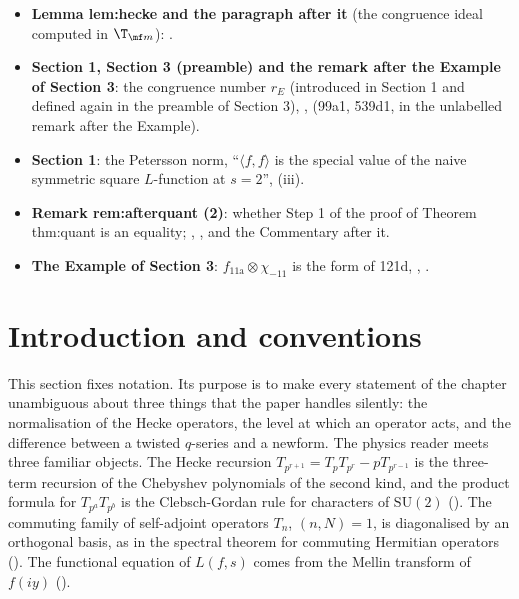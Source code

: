 \begin{itemize}
complement of $g^S$, idempotents of $\T_\ell$, the $\Z_\ell$-version of Lemma lem:crit for $\pi$, , , ,
, , . The theorem is proved in .
\item \textbf{Lemma lem:hecke and the paragraph after it} (the congruence ideal computed in $\T_{\mf m}$): .
\item \textbf{Section 1, Section 3 (preamble) and the remark after the Example of Section 3}: the congruence number $r_E$ (introduced in Section 1 and defined again in the
preamble of Section 3), ,  (99a1, 539d1, in the unlabelled remark after the Example).
\item \textbf{Section 1}: the Petersson norm, ``$\langle f,f\rangle$ is the special value of the naive symmetric square $L$-function at $s=2$'', (iii).
\item \textbf{Remark rem:afterquant (2)}: whether Step 1 of the proof of Theorem thm:quant is an equality; , ,
 and the Commentary after it.
\item \textbf{The Example of Section 3}: $f_{\text{11a}}\otimes\chi_{-11}$ is the form of 121d, , .
\end{itemize}

\section{Introduction and conventions}\label{sec:hecke:intro}

This section fixes notation. Its purpose is to make every statement of the chapter unambiguous about three things that the paper handles silently: the
normalisation of the Hecke operators, the level at which an operator acts, and the difference between a twisted $q$-series and a newform. The physics reader
meets three familiar objects. The Hecke recursion $T_{p^{r+1}}=T_pT_{p^r}-pT_{p^{r-1}}$ is the three-term recursion of the Chebyshev polynomials of the second kind,
and the product formula for $T_{p^a}T_{p^b}$ is the Clebsch-Gordan rule for characters of $\mathrm{SU}(2)$ (). The commuting family of
self-adjoint operators $T_n$, $(n,N)=1$, is diagonalised by an orthogonal basis, as in the spectral theorem for commuting Hermitian operators
(). The functional equation of $L(f,s)$ comes from the Mellin transform of $f(iy)$ ().

